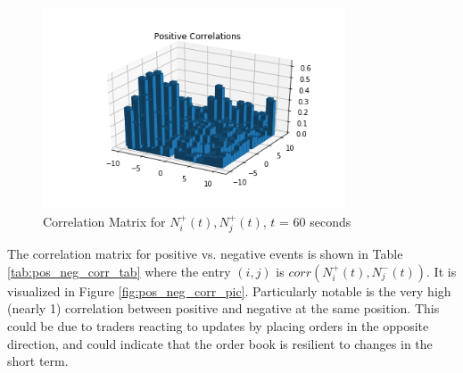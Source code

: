 \begin{figure}[t]
\begin{center}
\caption{Correlation Matrix for $N^{+}_i(t), N^{+}_j(t)$, $t$ = 60 seconds}
\label{fig:pos_pos_corr_pic}
\includegraphics[width=0.8\textwidth]{LaTeX/Figures/pos_pos_correlations.png}
\end{center}
\end{figure}

The correlation matrix for positive vs. negative events is shown in Table \ref{tab:pos_neg_corr_tab} where the entry $(i,j)$ is $corr(N^{+}_i(t), N^{-}_j(t))$. It is visualized in Figure \ref{fig:pos_neg_corr_pic}. Particularly notable is the very high (nearly 1) correlation between positive and negative at the same position. This could be due to traders reacting to updates by placing orders in the opposite direction, and could indicate that the order book is resilient to changes in the short term.

